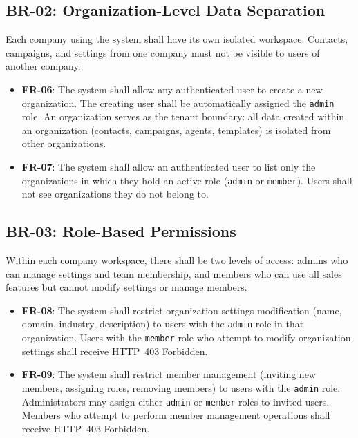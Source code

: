 \documentclass[a4paper]{article}
\begin{document}
\subsection{BR-02: Organization-Level Data Separation}

Each company using the system shall have its own isolated workspace.
Contacts, campaigns, and settings from one company must not be
visible to users of another company.

\begin{itemize}
    \item \textbf{FR-06}: The system shall allow any authenticated
    user to create a new organization. The creating user shall be
    automatically assigned the \texttt{admin} role. An organization
    serves as the tenant boundary: all data created within an
    organization (contacts, campaigns, agents, templates) is
    isolated from other organizations.

    \item \textbf{FR-07}: The system shall allow an authenticated
    user to list only the organizations in which they hold an active
    role (\texttt{admin} or \texttt{member}). Users shall not see
    organizations they do not belong to.
\end{itemize}

\subsection{BR-03: Role-Based Permissions}

Within each company workspace, there shall be two levels of access:
admins who can manage settings and team membership, and members who
can use all sales features but cannot modify settings or manage
members.

\begin{itemize}
    \item \textbf{FR-08}: The system shall restrict organization
    settings modification (name, domain, industry, description) to
    users with the \texttt{admin} role in that organization. Users
    with the \texttt{member} role who attempt to modify organization
    settings shall receive HTTP~403 Forbidden.

    \item \textbf{FR-09}: The system shall restrict member management
    (inviting new members, assigning roles, removing members) to
    users with the \texttt{admin} role. Administrators may assign
    either \texttt{admin} or \texttt{member} roles to invited users.
    Members who attempt to perform member management operations
    shall receive HTTP~403 Forbidden.
\end{itemize}
\end{document}
